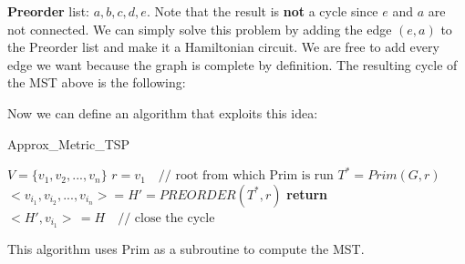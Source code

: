 \textbf{Preorder} list: $a, b, c, d, e$.\newline\newline
Note that the result is \textbf{not} a cycle since $e$ and $a$ are not connected. We can simply solve this problem by adding the edge $(e, a)$ to the Preorder list and make it a Hamiltonian circuit. We are free to add every edge we want because the graph is complete by definition.\newline\newline
The resulting cycle of the MST above is the following:\newline\newline
{}\newline\newline
Now we can define an algorithm that exploits this idea:
\begin{algorithm}
\caption{Approx\_Metric\_TSP}\label{ApproxMetricTSP}
    \begin{algorithmic}[1]
        \State $V = \{v_1, v_2, ..., v_n\}$
        \State $r = v_1 \quad \text{// root from which Prim is run}$
        \State $T^* = Prim(G, r)$
        \State $<v_{i_1}, v_{i_2}, ..., v_{i_n}> = H' = PREORDER(T^*, r)$
        \State \textbf{return} $<H', v_{i_1}>\, = H \quad \text{// close the cycle}$
    \EndProcedure   
    \end{algorithmic}
\end{algorithm}\newline\newline
This algorithm uses Prim as a subroutine to compute the MST.
